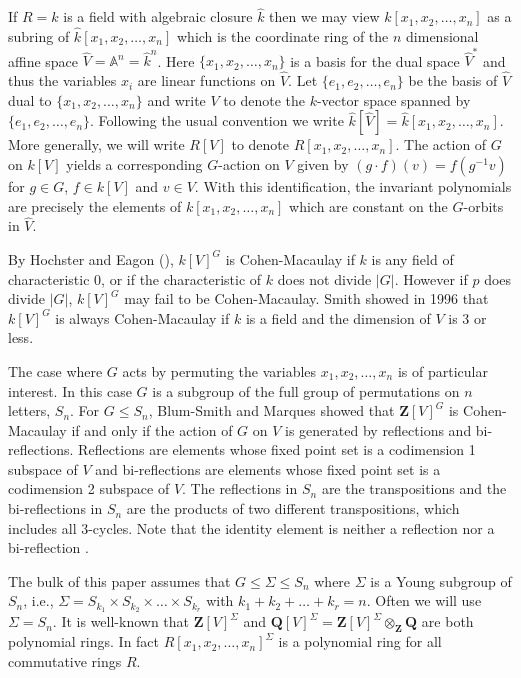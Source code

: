 \documentclass[12pt]{amsart}
\renewcommand{\leq}{\leqslant}
\newcommand{\QQ}{\mathbf{Q}} %
\newcommand{\ZZ}{\mathbf{Z}} %
\newcommand{\QQ}{\mathbb{Q}} %
\newcommand{\ZZ}{\mathbb{Z}} %
\newcommand{\Sn}{{S_n}}
\theoremstyle{definition}
\begin{document}
  If $R=k$ is a field with algebraic closure $\widehat{k}$ then we may view   $k[x_1,x_2,\dots,x_n]$ as a subring of  $\widehat{k}[x_1,x_2,\dots,x_n]$ which is the
  coordinate ring of the $n$ dimensional affine space 
  $\widehat{V}=\mathbb{A}^n=\widehat{k}^n$. 
    Here $\{x_1,x_2,\dots,x_n\}$ is a basis for the dual space $\widehat{V}^*$ and thus
    the variables $x_i$ are linear functions on $\widehat{V}$. 
       Let $\{e_1,e_2,\dots,e_n\}$ be the basis of $\widehat{V}$ dual to  $\{x_1,x_2,\dots,x_n\}$
   and write $V$ to denote the $k$-vector space spanned by $\{e_1,e_2,\dots,e_n\}$.
  Following the usual convention we write 
  $\widehat{k}[\widehat{V}]=\widehat{k}[x_1,x_2,\dots,x_n]$.
  More generally, we will write $R[V]$ to denote $R[x_1,x_2,\dots,x_n]$.
  The action of $G$ on $k[V]$ yields a corresponding  $G$-action
  on $V$ given by $(g\cdot f)(v) = f(g^{-1} v)$ for $g \in G$, $f \in k[V]$ and $v \in V$.  With this identification, the invariant polynomials are precisely the elements of $k[x_1,x_2,\dots,x_n]$
 which are constant on the $G$-orbits in $\widehat{V}$. 

  

 By Hochster and Eagon (\cite{H-E}), $k[V]^G$ is Cohen-Macaulay if $k$ is any  field of characteristic 0,
 or if the characteristic of $k$ does not divide $|G|$.
 However if $p$ does divide $|G|$,  $k[V]^G$ may fail to be Cohen-Macaulay.
 Smith \cite{S} showed in 1996 that $k[V]^G$ is always Cohen-Macaulay if $k$ is a field and the dimension of $V$ is 3 or less.
 
  The case where $G$ acts by permuting the variables $x_1,x_2,\dots,x_n$ is of particular interest.  In this case $G$ is a subgroup of the full group of 
  permutations on $n$ letters, $\Sn$.   For $G \leq \Sn$, 
Blum-Smith and Marques\cite{BenandSophie} showed that $\ZZ[V]^G$ is Cohen-Macaulay if and only if the action of
$G$ on $V$ is generated by reflections and bi-reflections.
Reflections are elements whose fixed point set is a codimension 1 subspace of $V$ and bi-reflections are elements whose fixed point set is a codimension 2 subspace of $V$. 
The reflections in $S_n$ are the transpositions and the bi-reflections in $\Sn$ 
are the products of two different transpositions, which includes all 3-cycles.
Note that the identity element is neither a reflection nor a bi-reflection .

The bulk of this paper assumes that $G \leq \Sigma \leq \Sn$ where $\Sigma$ is a Young subgroup of $\Sn$,
i.e., $\Sigma=S_{k_1} \times S_{k_2} \times \dots \times S_{k_r}$ with $k_1+k_2+\dots+k_r=n$.  Often we will use
$\Sigma=\Sn$.
 It is well-known that $\ZZ[V]^{\Sigma}$ and $\QQ[V]^{\Sigma} = \ZZ[V]^{\Sigma}\otimes_{\ZZ} \QQ$ are both
 polynomial rings.
In fact $R[x_1,x_2,\dots,x_n]^{\Sigma}$ is a polynomial 
ring for all commutative rings $R$.  
\end{document}

